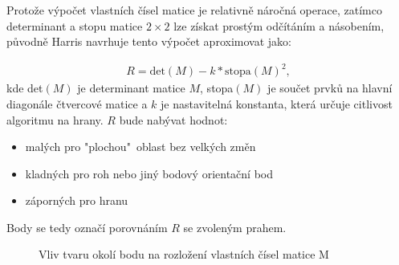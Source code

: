 %

Protože výpočet vlastních čísel matice je relativně náročná operace, zatímco determinant a stopu matice $2\times2$ lze získat prostým odčítáním a násobením, původně Harris navrhuje tento výpočet aproximovat jako:

\begin{align}
R = \text{det}(M) - k * \text{stopa}(M)^2,
\end{align}
kde det$(M)$ je determinant matice $M$, stopa$(M)$ je součet prvků na hlavní diagonále čtvercové matice a $k$ je nastavitelná konstanta, která určuje citlivost algoritmu na hrany. $R$ bude nabývat hodnot:
\begin{itemize}
	\item malých pro "plochou"\ oblast bez velkých změn
	\item kladných pro roh nebo jiný bodový orientační bod
	\item záporných pro hranu
\end{itemize} 

Body se tedy označí porovnáním $R$ se zvoleným prahem.

\begin{figure}[htp] 
	\label{Harris_eigen}
	\caption{Vliv tvaru okolí bodu na rozložení vlastních čísel matice M}
\end{figure}


